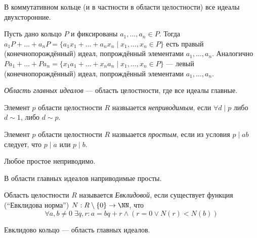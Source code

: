 \documentclass[12pt,a4paper]{article}
\begin{document}
    \begin{remark}
        В коммутативном кольце (и в частности в области целостности) все идеалы двухсторонние.
    \end{remark}

    \begin{example}
        Пусть дано кольцо $P$ и фиксированы $a_1, \dots, a_n \in P$. Тогда $a_1 P + \dots + a_n P = \{a_1 x_1 + \dots + a_n x_n \mid x_1, \dots, x_n \in P\}$ есть правый (конечнопорождённый) идеал, попрождённый элементами $a_1, \dots, a_n$. Аналогично $P a_1 + \dots + P a_n = \{x_1 a_1 + \dots + x_n a_n \mid x_1, \dots, x_n \in P\}$ --- левый (конечнопорождённый) идеал, попрождённый элементами $a_1, \dots, a_n$.
    \end{example}

    \begin{definition}
        \emph{Область главных идеалов} --- область целостности, где все идеалы главные.
    \end{definition}

    \begin{definition}
        Элемент $p$ области целостности $R$ назвыается \emph{неприводимым}, если $\forall d \mid p$ либо $d \sim 1$, либо $d \sim p$.
    \end{definition}
    
    \begin{definition}
        Элемент $p$ области целостности $R$ назвыается \emph{простым}, если из условия $p \mid ab$ следует, что $p \mid a$ или $p \mid b$.
    \end{definition}

    \begin{statement}
        Любое простое неприводимо.
    \end{statement}

    \begin{statement}
        В области главных идеалов наприводимые просты.
    \end{statement}

    \begin{definition}
        Область целостности $R$ называется \emph{Евклидовой}, если существует функция (``Евклидова норма'') $N: R\setminus\{0\} \to \NN$, что
        \[\forall a, b \neq 0\; \exists q, r: a = bq + r \wedge (r = 0 \vee N(r) < N(b))\]
    \end{definition}

    \begin{theorem}
        Евклидово кольцо --- область главных идеалов.
    \end{theorem}
\end{document}
